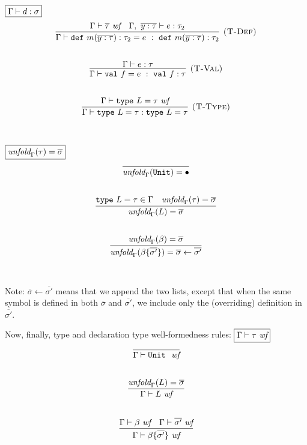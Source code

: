 \documentclass{article}
\newcommand{\keywadj}[1]{\mathtt{#1}}
\newcommand{\keyw}[1]{\keywadj{#1}~}
\begin{document}
$\fbox{$\Gamma \vdash d : \sigma$}$
\[
\begin{array}{c}
\infer[\textsc{(T-Def)}]
  {\Gamma \vdash \keyw{def} m(\overline{y : \tau}) : \tau_2 = e~:~\keyw{def} m(\overline{y : \tau}) : \tau_2}
  {\Gamma \vdash \overline{\tau}~\textit{wf} & \Gamma,~\overline{y : \tau} \vdash e : \tau_2}\\[5ex]

\infer[\textsc{(T-Val)}]
  {\Gamma \vdash \keyw{val} f = e~:~\keyw{val} f : \tau}
  {\Gamma \vdash e : \tau}\\[5ex]

\infer[\textsc{(T-Type)}]
  {\Gamma \vdash \keyw{type} L = \tau : \keyw{type} L = \tau}
  {\Gamma \vdash \keyw{type} L = \tau~\textit{wf}}\\[5ex]

\end{array}
\]

$\fbox{$\textit{unfold}_\Gamma(\tau) = \overline{\sigma}$}$
\[
\begin{array}{c}

\infer
  {\textit{unfold}_\Gamma(\keywadj{Unit}) = \bullet}
  {}\\[5ex]
  
\infer
  {\textit{unfold}_\Gamma(L) = \overline{\sigma}}
  {\keyw{type} L = \tau \in \Gamma & \textit{unfold}_\Gamma(\tau) = \overline{\sigma}}\\[5ex]
  
\infer
  {\textit{unfold}_\Gamma(\beta \{\overline{\sigma'}\}) = \overline{\sigma} \leftarrow \overline{\sigma'}}
  {\textit{unfold}_\Gamma(\beta) = \overline{\sigma}}\\[5ex]
  
\end{array}
\]

Note: $\overline{\sigma} \leftarrow \overline{\sigma'}$ means that we append the two lists, except that when the same symbol is defined in both $\overline{\sigma}$ and $\overline{\sigma'}$, we include only the (overriding) definition in $\overline{\sigma'}$.

Now, finally, type and declaration type well-formedness rules:
$\fbox{$\Gamma \vdash \tau~\textit{wf}$}$
\[
\begin{array}{c}
\infer
  {\Gamma \vdash \keyw{Unit}~\textit{wf}}
  {}\\[5ex]

\infer
  {\Gamma \vdash L~\textit{wf}}
  {\textit{unfold}_\Gamma(L) = \overline{\sigma}}\\[5ex]

\infer
  {\Gamma \vdash \beta \{\overline{\sigma'}\}~\textit{wf}}
  {\Gamma \vdash \beta ~\textit{wf} & \Gamma \vdash \overline{\sigma'}~\textit{wf}}\\[5ex]

\end{array}
\]
\end{document}
